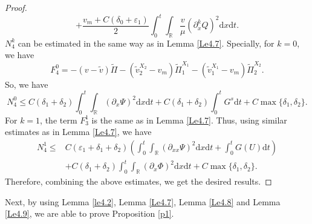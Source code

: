 \documentclass[10pt,reqno]{amsart}
\numberwithin{equation}{section}
\newcommand{\dif}{\mathrm{d}}
\begin{document}
\begin{proof}
\[   +\frac{v_m+C(\delta_0+\varepsilon_1)}{2}\int_0^t\int_\mathbb{R}\frac{v}{\mu}\left(\partial_{x}^{k}Q\right)^2\dif x \dif t.
\]
$N_4^k$ can be estimated in the same way as in Lemma \ref{Le4.7}. Specially, for $k=0$, we have
\[
F_4^0=-(v-\widetilde{v})\widetilde{\Pi}-\left(\widetilde{v}^{X_2}_2-v_m\right)\widetilde{\Pi}_1^{X_1}
-\left(\widetilde{v}^{X_1}_1-v_m\right)\widetilde{\Pi}_2^{X_2}.
\]
So, we have
\[
N_4^0\le C(\delta_1+\delta_2)\int_0^t\int_\mathbb{R}\left(\partial_{x}\Psi\right)^2\dif x \dif t+C(\delta_1+\delta_2)\int_0^tG^s\dif t
+C\max\{\delta_1,\delta_2\}.
\]
For $k=1$, the term $F_3^1$ is the same as in Lemma \ref{Le4.7}. Thus, using similar estimates as in Lemma \ref{Le4.7}, we have
\begin{align*}
N_4^1\le& C(\varepsilon_1+\delta_1+\delta_2)
\left(\int_0^t\int_\mathbb{R}\left(\partial_{xx}\Psi\right)^2\dif x \dif t+\int_0^tG(U)\dif t\right)\\
&+C(\delta_1+\delta_2)\int_0^t\int_\mathbb{R}\left(\partial_{x}\Phi\right)^2\dif x \dif t
+C\max\{\delta_1,\delta_2\}.
\end{align*}
Therefore, combining the above estimates, we get the desired results.
\end{proof}

Next, by using Lemma \ref{le4.2}, Lemma \ref{Le4.7}, Lemma \ref{Le4.8} and Lemma \ref{Le4.9}, we are able to prove Proposition \ref{p1}.
\end{document}
